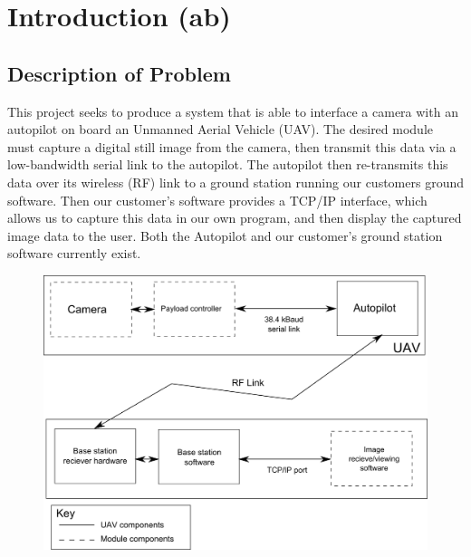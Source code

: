 \chapter{Introduction (ab)}

\section{Description of Problem}

This project seeks to produce a system that is able to interface a camera with an autopilot on board an Unmanned Aerial Vehicle (UAV). The desired module must capture a digital still image from the camera, then transmit this data via a low-bandwidth serial link to the autopilot. The autopilot then re-transmits this data over its wireless (RF) link to a ground station running our customers ground software. Then our customer's software provides a TCP/IP interface, which allows us to capture this data in our own program, and then display the captured image data to the user. Both the Autopilot and our customer's ground station software currently exist.

\begin{figure}[H]
        \centering
        \includegraphics[width=1.00\textwidth]{figures/spec_block_diagram_2.png}
        \label{fig:blockDiagram}
\end{figure}

